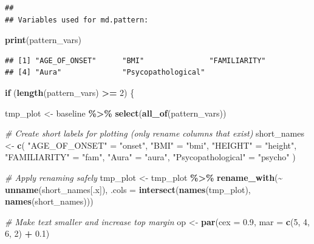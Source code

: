 \documentclass[
]{article}
\newenvironment{Shaded}{\begin{snugshade}}{\end{snugshade}}
\newcommand{\AttributeTok}[1]{\textcolor[rgb]{0.13,0.29,0.53}{#1}}
\newcommand{\CommentTok}[1]{\textcolor[rgb]{0.56,0.35,0.01}{\textit{#1}}}
\newcommand{\ControlFlowTok}[1]{\textcolor[rgb]{0.13,0.29,0.53}{\textbf{#1}}}
\newcommand{\DecValTok}[1]{\textcolor[rgb]{0.00,0.00,0.81}{#1}}
\newcommand{\FloatTok}[1]{\textcolor[rgb]{0.00,0.00,0.81}{#1}}
\newcommand{\FunctionTok}[1]{\textcolor[rgb]{0.13,0.29,0.53}{\textbf{#1}}}
\newcommand{\NormalTok}[1]{#1}
\newcommand{\OtherTok}[1]{\textcolor[rgb]{0.56,0.35,0.01}{#1}}
\newcommand{\SpecialCharTok}[1]{\textcolor[rgb]{0.81,0.36,0.00}{\textbf{#1}}}
\newcommand{\StringTok}[1]{\textcolor[rgb]{0.31,0.60,0.02}{#1}}
\begin{document}
\begin{verbatim}
## 
## Variables used for md.pattern:
\end{verbatim}

\begin{Shaded}
\begin{Highlighting}[]
\FunctionTok{print}\NormalTok{(pattern\_vars)}
\end{Highlighting}
\end{Shaded}

\begin{verbatim}
## [1] "AGE_OF_ONSET"      "BMI"               "FAMILIARITY"      
## [4] "Aura"              "Psycopathological"
\end{verbatim}

\begin{Shaded}
\begin{Highlighting}[]
\ControlFlowTok{if}\NormalTok{ (}\FunctionTok{length}\NormalTok{(pattern\_vars) }\SpecialCharTok{\textgreater{}=} \DecValTok{2}\NormalTok{) \{}

\NormalTok{  tmp\_plot }\OtherTok{\textless{}{-}}\NormalTok{ baseline }\SpecialCharTok{\%\textgreater{}\%} \FunctionTok{select}\NormalTok{(}\FunctionTok{all\_of}\NormalTok{(pattern\_vars))}

  \CommentTok{\# Create short labels for plotting (only rename columns that exist)}
\NormalTok{  short\_names }\OtherTok{\textless{}{-}} \FunctionTok{c}\NormalTok{(}
    \StringTok{"AGE\_OF\_ONSET"} \OtherTok{=} \StringTok{"onset"}\NormalTok{,}
    \StringTok{"BMI"} \OtherTok{=} \StringTok{"bmi"}\NormalTok{,}
    \StringTok{"HEIGHT"} \OtherTok{=} \StringTok{"height"}\NormalTok{,}
    \StringTok{"FAMILIARITY"} \OtherTok{=} \StringTok{"fam"}\NormalTok{,}
    \StringTok{"Aura"} \OtherTok{=} \StringTok{"aura"}\NormalTok{,}
    \StringTok{"Psycopathological"} \OtherTok{=} \StringTok{"psycho"}
\NormalTok{  )}

  \CommentTok{\# Apply renaming safely}
\NormalTok{  tmp\_plot }\OtherTok{\textless{}{-}}\NormalTok{ tmp\_plot }\SpecialCharTok{\%\textgreater{}\%}
    \FunctionTok{rename\_with}\NormalTok{(}\SpecialCharTok{\textasciitilde{}} \FunctionTok{unname}\NormalTok{(short\_names[.x]),}
                \AttributeTok{.cols =} \FunctionTok{intersect}\NormalTok{(}\FunctionTok{names}\NormalTok{(tmp\_plot), }\FunctionTok{names}\NormalTok{(short\_names)))}

  \CommentTok{\# Make text smaller and increase top margin}
\NormalTok{  op }\OtherTok{\textless{}{-}} \FunctionTok{par}\NormalTok{(}\AttributeTok{cex =} \FloatTok{0.9}\NormalTok{, }\AttributeTok{mar =} \FunctionTok{c}\NormalTok{(}\DecValTok{5}\NormalTok{, }\DecValTok{4}\NormalTok{, }\DecValTok{6}\NormalTok{, }\DecValTok{2}\NormalTok{) }\SpecialCharTok{+} \FloatTok{0.1}\NormalTok{)}


\end{Highlighting}
\end{Shaded}
\end{document}
